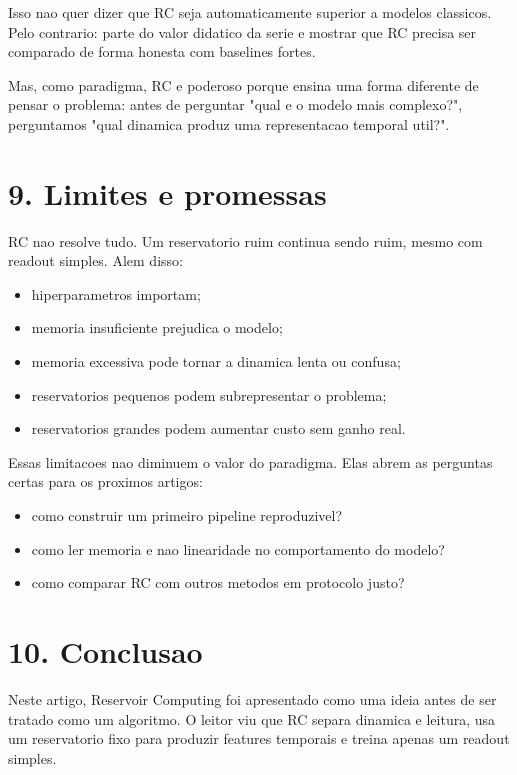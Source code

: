\documentclass[12pt]{article}
\providecommand{\tightlist}{%
  \setlength{\itemsep}{0pt}\setlength{\parskip}{0pt}}
\begin{document}
Isso nao quer dizer que RC seja automaticamente superior a modelos classicos. Pelo contrario: parte do valor didatico da serie e mostrar que RC precisa ser comparado de forma honesta com baselines fortes.

Mas, como paradigma, RC e poderoso porque ensina uma forma diferente de pensar o problema: antes de perguntar "qual e o modelo mais complexo?", perguntamos "qual dinamica produz uma representacao temporal util?".

\section{9. Limites e promessas}\label{9-limites-e-promessas}

RC nao resolve tudo. Um reservatorio ruim continua sendo ruim, mesmo com readout simples. Alem disso:

\begin{itemize}
\tightlist
\item
  hiperparametros importam;
\item
  memoria insuficiente prejudica o modelo;
\item
  memoria excessiva pode tornar a dinamica lenta ou confusa;
\item
  reservatorios pequenos podem subrepresentar o problema;
\item
  reservatorios grandes podem aumentar custo sem ganho real.
\end{itemize}

Essas limitacoes nao diminuem o valor do paradigma. Elas abrem as perguntas certas para os proximos artigos:

\begin{itemize}
\tightlist
\item
  como construir um primeiro pipeline reproduzivel?
\item
  como ler memoria e nao linearidade no comportamento do modelo?
\item
  como comparar RC com outros metodos em protocolo justo?
\end{itemize}

\section{10. Conclusao}\label{10-conclusao}

Neste artigo, Reservoir Computing foi apresentado como uma ideia antes de ser tratado como um algoritmo. O leitor viu que RC separa dinamica e leitura, usa um reservatorio fixo para produzir features temporais e treina apenas um readout simples.
\end{document}
